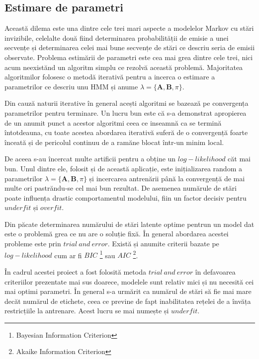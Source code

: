 \subsection{Estimare de parametri}
Această dilema este una dintre cele trei mari aspecte a modelelor Markov cu stări invizibile, celelalte două fiind determinarea probabilității de emisie a unei secvențe și determinarea celei mai bune secvențe de stări ce descriu seria de emisii observate. Problema estimării de parametri este cea mai grea dintre cele trei, nici acum neexistănd un algoritm simplu ce rezolvă această problemă. Majoritatea algoritmilor folosesc o metodă iterativă pentru a incerca o estimare a parametrilor ce descriu unu HMM și anume $\lambda = \{\textbf{A},\textbf{B},\pi\}$.\par

Din cauză naturii iterative în general acești algoritmi se bazează pe convergența parametrilor pentru terminare. Un lucru bun este că s-a demonstrat apropierea de un anumit punct a acestor algoritmi ceea ce inseamnă ca se termină întotdeauna, cu toate acestea abordarea iterativă suferă de o convergență foarte înceată și de pericolul continuu de a ramăne blocat într-un minim local.\par

De aceea s-au încercat multe artificii pentru a obține un $log-likelihood$ căt mai bun. Unul dintre ele, folosit și de această aplicație, este inițializarea random a parametrilor $\lambda = \{\textbf{A},\textbf{B},\pi\}$ și incercarea antrenării până la convergență de mai multe ori pastrăndu-se cel mai bun rezultat. De asemenea numărule de stări poate influența drastic comportamentul modelului, fiin un factor decisiv pentru $underfit$ și $overfit$.\par

Din păcate determinarea numărului de stări latente optime pentrun un model dat este o problemă grea ce nu are o soluție fixă. În general abordarea acestei probleme este prin $trial\ and\ error$. Există și anumite criterii bazate pe $log-likelihood$ cum ar fi $BIC$ \footnote{Bayesian Information Criterion} sau $AIC$ \footnote{Akaike Information Criterion}.\par

În cadrul acestei proiect a fost folosită metoda $trial\ and\ error$ în defavoarea criteriilor prezentate mai sus doarece, modelele sunt relativ mici și nu necesită cei mai optimi parametri. În general s-a urmărit ca numărul de stări să fie mai mare decăt numărul de etichete, ceea ce previne de fapt inabilitatea rețelei de a învăța restricțiile la antrenare. Acest lucru se mai numește și $underfit$.\par


